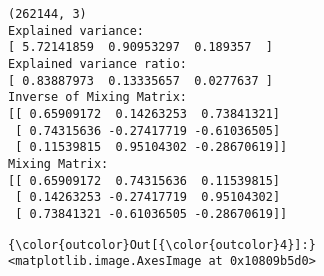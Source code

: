 \documentclass{article}
\begin{document}
    \begin{Verbatim}[commandchars=\\\{\}]
(262144, 3)
Explained variance:
[ 5.72141859  0.90953297  0.189357  ]
Explained variance ratio:
[ 0.83887973  0.13335657  0.0277637 ]
Inverse of Mixing Matrix:
[[ 0.65909172  0.14263253  0.73841321]
 [ 0.74315636 -0.27417719 -0.61036505]
 [ 0.11539815  0.95104302 -0.28670619]]
Mixing Matrix:
[[ 0.65909172  0.74315636  0.11539815]
 [ 0.14263253 -0.27417719  0.95104302]
 [ 0.73841321 -0.61036505 -0.28670619]]
    \end{Verbatim}

            \begin{Verbatim}[commandchars=\\\{\}]
{\color{outcolor}Out[{\color{outcolor}4}]:} <matplotlib.image.AxesImage at 0x10809b5d0>
\end{Verbatim}
        
    \begin{center}
    \end{center}
    { \hspace*{\fill} \\}
    
\end{document}
